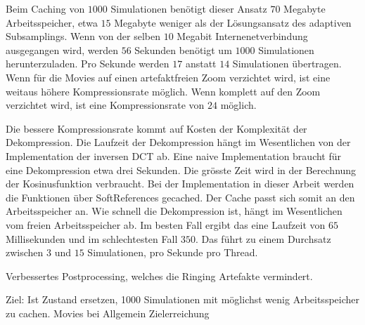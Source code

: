 Beim Caching von $1000$ Simulationen benötigt dieser Ansatz $70$ Megabyte Arbeitsspeicher, etwa $15$ Megabyte weniger als der Lösungsansatz des adaptiven Subsamplings. Wenn von der selben $10$ Megabit Internenetverbindung ausgegangen wird, werden $56$ Sekunden benötigt um $1000$ Simulationen herunterzuladen. Pro Sekunde werden $17$ anstatt $14$ Simulationen übertragen. Wenn für die Movies auf einen artefaktfreien Zoom verzichtet wird, ist eine weitaus höhere Kompressionsrate möglich. Wenn komplett auf den Zoom verzichtet wird, ist eine Kompressionsrate von $24$ möglich.

Die bessere Kompressionsrate kommt auf Kosten der Komplexität der Dekompression. Die Laufzeit der Dekompression hängt im Wesentlichen von der Implementation der inversen DCT ab. Eine naive Implementation braucht für eine Dekompression etwa drei Sekunden. Die grösste Zeit wird in der Berechnung der Kosinusfunktion verbraucht. Bei der Implementation in dieser Arbeit werden die Funktionen über SoftReferences gecached. Der Cache passt sich somit an den Arbeitsspeicher an. Wie schnell die Dekompression ist, hängt im Wesentlichen vom freien Arbeitsspeicher ab. Im besten Fall ergibt das eine Laufzeit von $65$ Millisekunden und im schlechtesten Fall $350$. Das führt zu einem Durchsatz zwischen $3$ und $15$ Simulationen, pro Sekunde pro Thread.

Verbessertes Postprocessing, welches die Ringing Artefakte vermindert.



Ziel: Ist Zustand ersetzen, 1000 Simulationen mit möglichst wenig Arbeitsspeicher zu cachen. Movies bei 
Allgemein Zielerreichung